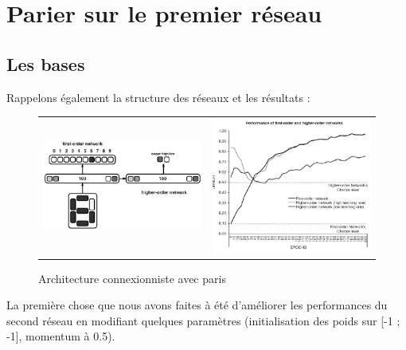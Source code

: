 \documentclass[a4paper,12pt, twoside]{article}
\begin{document}
\section{Parier sur le premier réseau}

\subsection{Les bases}

Rappelons également la structure des réseaux et les résultats :
\begin{figure}[H]
\begin{center}
\begin{tabular}{cc}
 \includegraphics[width=220px]{../cleeremans_2007/digital_reco/schema.png} &
 \includegraphics[width=220px]{../cleeremans_2007/digital_reco/perf_article.png}
\end{tabular}
\end{center}
 \caption{ \cite{Cleeremans_2007}  Architecture connexionniste avec paris  }
\end{figure}


La première chose que nous avons faites à été d'améliorer les performances du second réseau
en modifiant quelques paramètres (initialisation des poids sur [-1 ; -1], momentum à 0.5). 
\end{document}
